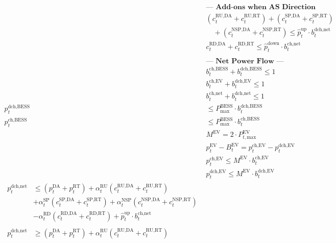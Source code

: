 \documentclass[conference]{IEEEtran}
\begin{document}
{\begin{align}
    \nonumber \\
    & \textbf{--- Add-ons when AS Direction Aligned ---} \nonumber \\
    & (c_{t}^{\text{RU,DA}} + c_{t}^{\text{RU,RT}}) + (c_{t}^{\text{SP,DA}} + c_{t}^{\text{SP,RT}}) \nonumber \\
    & \quad + (c_{t}^{\text{NSP,DA}} + c_{t}^{\text{NSP,RT}}) \le \hat{p}_{t}^{\text{up}} \cdot b_{t}^{\text{dch,net}} \\
    & c_{t}^{\text{RD,DA}} + c_{t}^{\text{RD,RT}} \le \hat{p}_{t}^{\text{down}} \cdot b_{t}^{\text{ch,net}} \\
    \nonumber \\
    & \textbf{--- Net Power Flow ---} \nonumber \\
    & b_{t}^{\text{ch,BESS}} + b_{t}^{\text{dch,BESS}} \le 1 \\
    & b_{t}^{\text{ch,EV}} + b_{t}^{\text{dch,EV}} \le 1 \\
    & b_{t}^{\text{ch,net}} + b_{t}^{\text{dch,net}} \le 1 \\
    p_{t}^{\text{dch,BESS}} &\le P_{\text{max}}^{\text{BESS}} \cdot b_{t}^{\text{dch,BESS}} \\
    p_{t}^{\text{ch,BESS}} &\le P_{\text{max}}^{\text{BESS}} \cdot b_{t}^{\text{ch,BESS}} \\
    & M^{\text{EV}} = 2 \cdot P_{t, \text{max}}^{\text{EV}} \\
    & p_{t}^{\text{EV}} - B_{t}^{\text{EV}} = p_{t}^{\text{ch,EV}} - p_{t}^{\text{dch,EV}} \\
    & p_{t}^{\text{ch,EV}} \le M^{\text{EV}} \cdot b_{t}^{\text{ch,EV}} \\
    & p_{t}^{\text{dch,EV}} \le M^{\text{EV}} \cdot b_{t}^{\text{dch,EV}} \\
    \begin{split} 
        p_{t}^{\text{dch,net}} &\le (p_{t}^{\text{DA}} + p_{t}^{\text{RT}}) + \alpha_{t}^{\text{RU}} (c_{t}^{\text{RU,DA}} + c_{t}^{\text{RU,RT}}) \\ 
        & + \alpha_{t}^{\text{SP}} (c_{t}^{\text{SP,DA}} + c_{t}^{\text{SP,RT}}) + \alpha_{t}^{\text{NSP}} (c_{t}^{\text{NSP,DA}} + c_{t}^{\text{NSP,RT}}) \\
        & - \alpha_{t}^{\text{RD}} (c_{t}^{\text{RD,DA}} + c_{t}^{\text{RD,RT}}) + \hat{p}_{t}^{\text{up}} \cdot b_{t}^{\text{ch,net}}
    \end{split} \\
    \begin{split} 
        p_{t}^{\text{dch,net}} &\ge (p_{t}^{\text{DA}} + p_{t}^{\text{RT}}) + \alpha_{t}^{\text{RU}} (c_{t}^{\text{RU,DA}} + c_{t}^{\text{RU,RT}}) \\ 

\end{split}
\end{align}}
\end{document}
